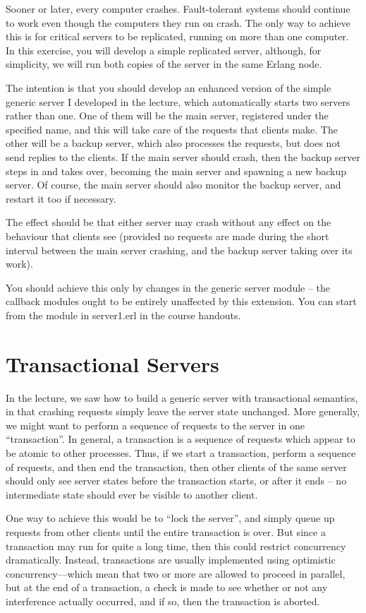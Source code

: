 \documentclass{article}
\begin{document}
Sooner or later, every computer crashes. Fault-tolerant systems should
continue to work even though the computers they run on crash. The only
way to achieve this is for critical servers to be replicated, running
on more than one computer. In this exercise, you will develop a simple
replicated server, although, for simplicity, we will run both copies
of the server in the same Erlang node.

The intention is that you should develop an enhanced version of the
simple generic server I developed in the lecture, which automatically
starts two servers rather than one. One of them will be the main
server, registered under the specified name, and this will take care
of the requests that clients make. The other will be a backup server,
which also processes the requests, but does not send replies to the
clients. If the main server should crash, then the backup server steps
in and takes over, becoming the main server and spawning a new backup
server. Of course, the main server should also monitor the backup
server, and restart it too if necessary.

The effect should be that either server may crash without any effect
on the behaviour that clients see (provided no requests are made
during the short interval between the main server crashing, and the
backup server taking over its work).

You should achieve this only by changes in the generic server
module -- the callback modules ought to be entirely unaffected by this
extension. You can start from the module in \textsf{server1.erl} in
the course handouts.

\section{Transactional Servers}

In the lecture, we saw how to build a generic server with
transactional semantics, in that crashing requests simply leave the
server state unchanged. More generally, we might want to perform a
sequence of requests to the server in one “transaction”. In general, a
transaction is a sequence of requests which appear to be atomic to
other processes. Thus, if we start a transaction, perform a sequence
of requests, and then end the transaction, then other clients of the
same server should only see server states before the transaction
starts, or after it ends -- no intermediate state should ever be visible
to another client.

One way to achieve this would be to “lock the server”, and simply
queue up requests from other clients until the entire transaction is
over.  But since a transaction may run for quite a long time, then
this could restrict concurrency dramatically. Instead, transactions
are usually implemented using optimistic concurrency—which mean that
two or more are allowed to proceed in parallel, but at the end of a
transaction, a check is made to see whether or not any interference
actually occurred, and if so, then the transaction is aborted.
\end{document}
